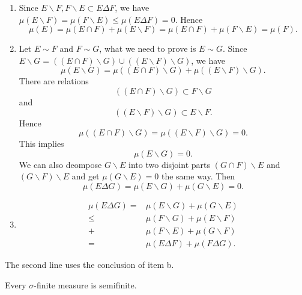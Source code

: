 \begin{sol}
  \begin{enumerate}
    \item Since $E\backslash F,F\backslash E\subset E\Delta F$, we have $\mu\left( E\backslash F \right)=\mu\left( F\backslash E \right) \le \mu\left( E\Delta F \right) =0 $. Hence
      \[
      \mu\left( E \right) =\mu\left( E\cap F \right) +\mu\left( E\backslash F \right) =\mu\left( E\cap F \right) +\mu\left( F\backslash E \right) =\mu\left( F \right) 
      .\]
    \item Let $E\sim F$ and $F\sim G$, what we need to prove is $E\sim G$. Since $E\backslash G=\left(\left( E\cap F \right) \backslash  G\right)\cup \left( \left( E\backslash F \right) \backslash G \right) $, we have
      \[
      \mu\left( E\backslash G \right) =\mu\left( \left( E\cap F \right) \backslash G \right) +\mu\left( \left( E\backslash F \right) \backslash G \right) 
      .\]
      There are relations
      \[
      \left( \left( E\cap F \right) \backslash G \right) \subset  F\backslash G 
      \]
      and
      \[
      \left( \left( E\backslash F \right) \backslash G \right) \subset E\backslash F
      .\]
      Hence 
       \[
      \mu\left( \left( E\cap F \right) \backslash G \right) =\mu\left( \left( E\backslash F \right)\backslash  G \right) =0
      .\] This implies
      \[
      \mu\left( E\backslash G \right) =0
      .\] 
      We can also deompose $G\backslash E$ into two disjoint parts $\left( G\cap F \right) \backslash E$ and $\left( G\backslash F \right) \backslash E$ and get $\mu\left( G\backslash E \right) =0$ the same way. Then
      \[
      \mu\left( E\Delta G \right) =\mu\left( E\backslash G \right) +\mu\left( G\backslash E \right) =0
      .\]
    \item 
      \begin{align*}
	\mu\left( E\Delta G \right) = & \mu\left( E\backslash G \right) +\mu\left( G\backslash E \right) \\
	\le & \mu\left( F\backslash G \right) +\mu\left( E\backslash F \right) \\
	+&\mu\left( F\backslash E \right)+\mu\left( G\backslash F \right)\\
	=& \mu\left( E\Delta F \right) +\mu\left( F\Delta G \right) 
      .\end{align*}
  \end{enumerate}
  The second line uses the conclusion of item b.
\end{sol}
\begin{exe}
  Every $\sigma$-finite measure is semifinite.
\end{exe}
